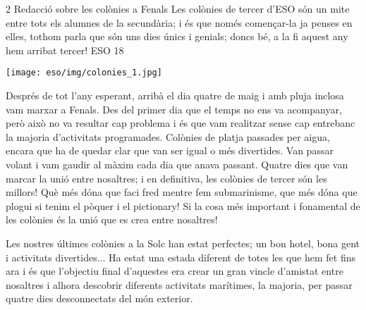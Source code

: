 
\begin{news}
{2} %
{Redacció sobre les colònies a Fenals}
{Les colònies de tercer d’ESO són un mite entre tots els alumnes de la secundària; i és que només començar-la ja penses en elles, tothom parla que són uns dies únics i genials; doncs bé, a la fi aquest any hem arribat  tercer!}
{ESO}
{18} %

\noindent\texttt{[image: eso/img/colonies\_1.jpg]}

Després de tot l’any esperant,  arribà el dia quatre de maig i amb pluja inclosa vam marxar a Fenals. Des del primer dia que el temps no ens va acompanyar, però això no va resultar cap problema i és que vam realitzar sense cap entrebanc la majoria d’activitats programades.  Colònies de platja passades per aigua, encara que ha de quedar clar que van ser igual o més divertides. Van passar volant i vam gaudir al màxim cada dia que anava passant. Quatre dies que van marcar la unió entre nosaltres; i en definitiva, les colònies de tercer són les millors! Què més dóna que faci fred mentre fem submarinisme, que més dóna que plogui si tenim el pòquer i el pictionary! Si la cosa més important i fonamental de les colònies és la unió que es crea entre nosaltres!

Les nostres últimes colònies a la Solc han estat perfectes; un bon hotel, bona gent i activitats divertides... Ha estat una estada diferent de totes les que hem fet fins ara i és que l’objectiu final d’aquestes era crear un gran vincle d’amistat entre nosaltres i alhora descobrir diferents activitats marítimes, la majoria, per passar quatre dies desconnectats del món exterior.


\end{news}

\newssep
{}

